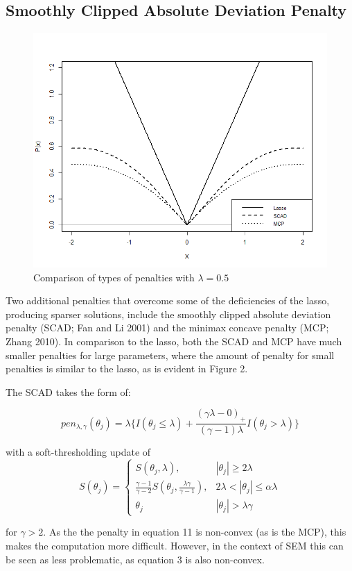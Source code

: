 \documentclass[article]{jss}
\begin{document}
\subsection{Smoothly Clipped Absolute Deviation
Penalty}\label{smoothly-clipped-absolute-deviation-penalty}

\begin{figure}
    \centering
    \includegraphics[width=.5\linewidth]{figs/penalties}
    \caption{Comparison of types of penalties with $\lambda=0.5$}
\end{figure}

Two additional penalties that overcome some of the deficiencies of the
lasso, producing sparser solutions, include the smoothly clipped
absolute deviation penalty (SCAD; Fan and Li 2001) and the minimax
concave penalty (MCP; Zhang 2010). In comparison to the lasso, both the
SCAD and MCP have much smaller penalties for large parameters, where the
amount of penalty for small penalties is similar to the lasso, as is
evident in Figure 2.

The SCAD takes the form of:

\[
pen_{\lambda,\gamma}(\theta_{j}) = \lambda \big\{I(\theta_{j}\leq\lambda) + \frac{(\gamma \lambda-0)_{+}}{(\gamma-1)\lambda}I(\theta_{j}>\lambda)\big\}
\]

\noindent
with a soft-thresholding update of \[
S(\theta_{j})= 
\begin{cases}
S(\theta_{j},\lambda),&  |\theta_{j}| \geq 2\lambda\\
\frac{\gamma-1}{\gamma-2}S(\theta_{j},\frac{\lambda\gamma}{\gamma-1}),              & 2\lambda < |\theta_{j}|\leq\alpha\lambda\\
\theta_{j} & |\theta_{j}| > \lambda \gamma
\end{cases}
\]

\noindent
for \(\gamma > 2\). As the the penalty in equation 11 is non-convex (as
is the MCP), this makes the computation more difficult. However, in the
context of SEM this can be seen as less problematic, as equation 3 is
also non-convex.
\end{document}
